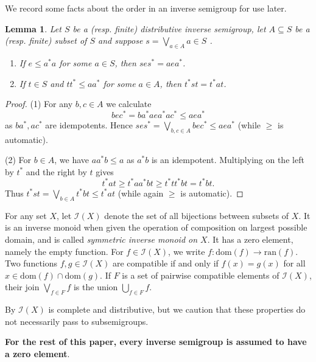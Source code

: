 \documentclass[12pt]{amsart}
\newtheorem{lemma}[thm]{Lemma}
\theoremstyle{definition}
\theoremstyle{remark}
\numberwithin{equation}{section}
\newcommand{\dom}{\text{dom}}
\newcommand{\ran}{\text{ran}}
\newcommand{\I}{\mathcal{I}}
\begin{document}
	We record some facts about the order in an inverse semigroup for use later.
	\begin{lemma}\label{lem:ISG_order_wedge}
		Let $S$ be a (resp. finite) distributive inverse semigroup, let $A\subseteq  S$ be a (resp. finite) subset of $S$ and suppose $s = \bigvee_{a\in A}a\in S$ .
		
		\begin{enumerate}
			\item If $e\leqslant a^*a$ for some $a\in S$, then $ses^* = aea^*$. 
			\item If $t\in S$ and $tt^*\leqslant aa^*$ for some $a\in A$, then $t^*st = t^*at$. 
		\end{enumerate}	
	\end{lemma}
		\begin{proof}
		(1) For any $b, c\in A$ we calculate
		\[
		bec^* = ba^*aea^*ac^*\leqslant aea^*
		\]
		as $ba^*, ac^*$ are idempotents. Hence $ses^* = \bigvee_{b,c\in A}bec^* \leqslant aea^*$ (while $\geqslant$ is automatic). 	
		
		(2) For $b\in A$, we have $aa^*b\leqslant a$ as $a^*b$ is an idempotent. Multiplying on the left by $t^*$ and the right by $t$ gives
		\[
		t^*at\geqslant t^*aa^*bt \geqslant t^*tt^*bt = t^*bt.
		\]
		Thus $t^*st = \bigvee_{b\in A}t^*bt\leqslant t^*at$ (while again $\geqslant$ is automatic).
	\end{proof}
	For any set $X$, let $\I(X)$ denote the set of all bijections between subsets of $X$. It is an inverse monoid when given the operation of composition on largest possible domain, and is called {\em symmetric inverse monoid on $X$}. It has a zero element, namely the empty function. For $f\in \I(X)$, we write $f:\dom(f)\to \ran(f)$.  Two functions $f,g\in \I(X)$ are compatible if and only if $f(x) = g(x)$ for all $x\in \dom(f)\cap \dom(g)$. If $F$ is a set of pairwise compatible elements of $\I(X)$, their join $\bigvee_{f\in F}f$ is the union $\bigcup_{f\in F}f$. 
	
	By \cite[Proposition~1.2.1]{La98} $\I(X)$ is complete and distributive, but we caution that these properties do not necessarily pass to subsemigroups. 
	
	{\bf For the rest of this paper, every inverse semigroup is assumed to have a zero element}. 
	
	
	
	
	
	
	
	
	
	
	
	
	
\end{document}
